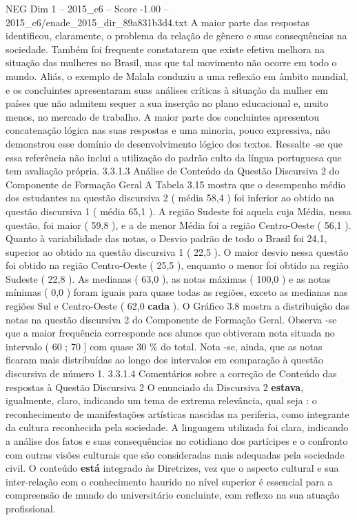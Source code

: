 \begin{textsample}{NEG Dim 1 – 2015\_c6 – Score -1.00 – 2015\_c6/enade\_2015\_dir\_89a831b3d4.txt}
A maior parte das respostas identificou, claramente, o problema da relação de gênero e suas consequências na sociedade.
Também foi frequente constatarem que existe efetiva melhora na situação das mulheres no Brasil, mas que tal movimento não ocorre em todo o mundo.
Aliás, o exemplo de Malala conduziu a uma reflexão em âmbito mundial, e os concluintes apresentaram suas análises críticas à situação da mulher em países que não admitem sequer a sua inserção no plano educacional e, muito menos, no mercado de trabalho.
A maior parte dos concluintes apresentou concatenação lógica nas suas respostas e uma minoria, pouco expressiva, não demonstrou esse domínio de desenvolvimento lógico dos textos.
Ressalte -se que essa referência não inclui a utilização do padrão culto da língua portuguesa que tem avaliação própria. 3.3.1.3 Análise de Conteúdo da Questão Discursiva 2 do Componente de Formação Geral A Tabela 3.15 mostra que o desempenho médio dos estudantes na questão discursiva 2 ( média 58,4 ) foi inferior ao obtido na questão discursiva 1 ( média 65,1 ).
A região Sudeste foi aquela cuja Média, nessa questão, foi maior ( 59,8 ), e a de menor Média foi a região Centro-Oeste ( 56,1 ).
Quanto à variabilidade das notas, o Desvio padrão de todo o Brasil foi 24,1, superior ao obtido na questão discursiva 1 ( 22,5 ).
O maior desvio nessa questão foi obtido na região Centro-Oeste ( 25,5 ), enquanto o menor foi obtido na região Sudeste ( 22,8 ).
As medianas ( 63,0 ), as notas máximas ( 100,0 ) e as notas mínimas ( 0,0 ) foram iguais para quase todas as regiões, exceto as medianas nas regiões Sul e Centro-Oeste ( 62,0 \textbf{cada} ).
O Gráfico 3.8 mostra a distribuição das notas na questão discursiva 2 do Componente de Formação Geral.
Observa -se que a maior frequência corresponde aos alunos que obtiveram nota situada no intervalo ( 60 ; 70 ] com quase 30 \% do total.
Nota -se, ainda, que as notas ficaram mais distribuídas ao longo dos intervalos em comparação à questão discursiva de número 1. 3.3.1.4 Comentários sobre a correção de Conteúdo das respostas à Questão Discursiva 2 O enunciado da Discursiva 2 \textbf{estava}, igualmente, claro, indicando um tema de extrema relevância, qual seja : o reconhecimento de manifestações artísticas nascidas na periferia, como integrante da cultura reconhecida pela sociedade.
A linguagem utilizada foi clara, indicando a análise dos fatos e suas consequências no cotidiano dos partícipes e o confronto com outras visões culturais que são consideradas mais adequadas pela sociedade civil.
O conteúdo \textbf{está} integrado às Diretrizes, vez que o aspecto cultural e sua inter-relação com o conhecimento haurido no nível superior é essencial para a compreensão de mundo do universitário concluinte, com reflexo na sua atuação profissional.

\end{textsample}
